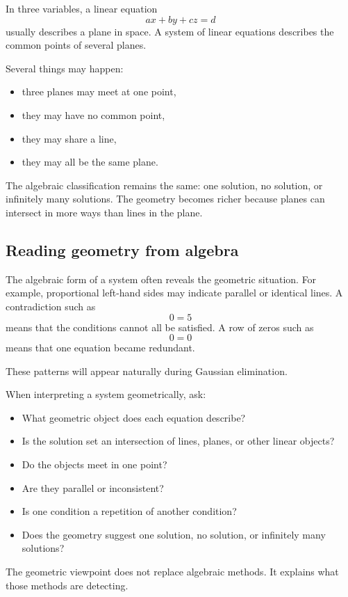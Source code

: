 In three variables, a linear equation
\[
ax+by+cz=d
\]
usually describes a plane in space. A system of linear equations describes the common points of several planes.

Several things may happen:
\begin{itemize}
\item three planes may meet at one point,
\item they may have no common point,
\item they may share a line,
\item they may all be the same plane.
\end{itemize}

The algebraic classification remains the same: one solution, no solution, or infinitely many solutions. The geometry becomes richer because planes can intersect in more ways than lines in the plane.

\subsection*{Reading geometry from algebra}

The algebraic form of a system often reveals the geometric situation. For example, proportional left-hand sides may indicate parallel or identical lines. A contradiction such as
\[
0=5
\]
means that the conditions cannot all be satisfied. A row of zeros such as
\[
0=0
\]
means that one equation became redundant.

These patterns will appear naturally during Gaussian elimination.

\begin{summarybox}
When interpreting a system geometrically, ask:
\begin{itemize}
\item What geometric object does each equation describe?
\item Is the solution set an intersection of lines, planes, or other linear objects?
\item Do the objects meet in one point?
\item Are they parallel or inconsistent?
\item Is one condition a repetition of another condition?
\item Does the geometry suggest one solution, no solution, or infinitely many solutions?
\end{itemize}
\end{summarybox}

The geometric viewpoint does not replace algebraic methods. It explains what those methods are detecting.